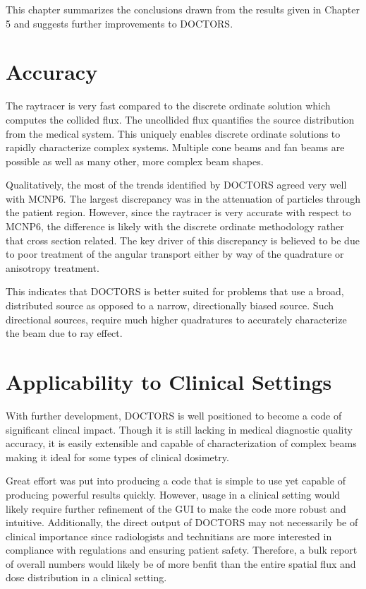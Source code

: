 
This chapter summarizes the conclusions drawn from the results given in Chapter 5 and suggests further improvements to DOCTORS.

\section{Accuracy}

The raytracer is very fast compared to the discrete ordinate solution which computes the collided flux. The uncollided flux quantifies the source distribution from the medical system. This uniquely enables discrete ordinate solutions to rapidly characterize complex systems. Multiple cone beams and fan beams are possible as well as many other, more complex beam shapes.

Qualitatively, the most of the trends identified by DOCTORS agreed very well with MCNP6. The largest discrepancy was in the attenuation of particles through the patient region. However, since the raytracer is very accurate with respect to MCNP6, the difference is likely with the discrete ordinate methodology rather that cross section related. The key driver of this discrepancy is believed to be due to poor treatment of the angular transport either by way of the quadrature or anisotropy treatment.

This indicates that DOCTORS is better suited for problems that use a broad, distributed source as opposed to a narrow, directionally biased source. Such directional sources, require much higher quadratures to accurately characterize the beam due to ray effect.

\section{Applicability to Clinical Settings}
With further development, DOCTORS is well positioned to become a code of significant clincal impact. Though it is still lacking in medical diagnostic quality accuracy, it is easily extensible and capable of characterization of complex beams making it ideal for some types of clinical dosimetry.

Great effort was put into producing a code that is simple to use yet capable of producing powerful results quickly. However, usage in a clinical setting would likely require further refinement of the GUI to make the code more robust and intuitive. Additionally, the direct output of DOCTORS may not necessarily be of clinical importance since radiologists and technitians are more interested in compliance with regulations and ensuring patient safety. Therefore, a bulk report of overall numbers would likely be of more benfit than the entire spatial flux and dose distribution in a clinical setting.

